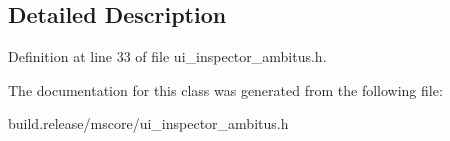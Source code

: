 \subsection{Detailed Description}


Definition at line 33 of file ui\+\_\+inspector\+\_\+ambitus.\+h.



The documentation for this class was generated from the following file\+:\begin{DoxyCompactItemize}
\item 
build.\+release/mscore/ui\+\_\+inspector\+\_\+ambitus.\+h\end{DoxyCompactItemize}

